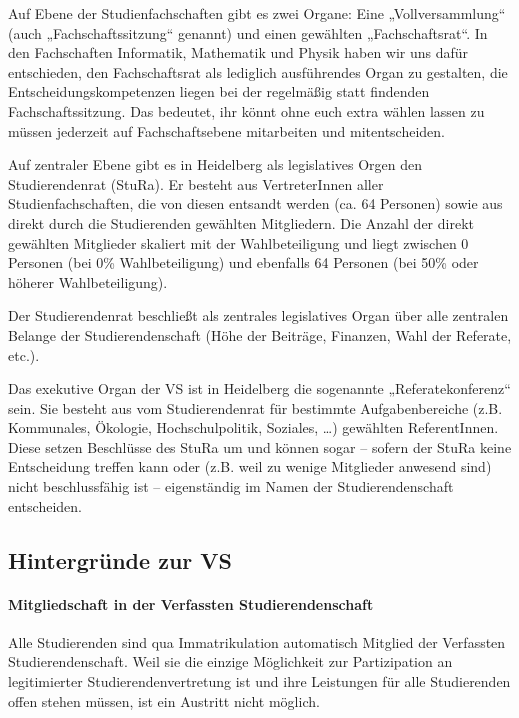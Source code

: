 Auf Ebene der Studienfachschaften gibt es zwei Organe: Eine „Vollversammlung“ 
(auch „Fachschaftssitzung“ genannt) und einen gewählten „Fachschaftsrat“. In den 
Fachschaften Informatik, Mathematik und Physik haben wir uns dafür entschieden, 
den Fachschaftsrat als lediglich ausführendes Organ zu gestalten, die 
Entscheidungskompetenzen liegen bei der regelmäßig statt findenden Fachschaftssitzung.
Das bedeutet, ihr könnt ohne euch extra wählen lassen zu müssen jederzeit
auf Fachschaftsebene mitarbeiten und mitentscheiden.

Auf zentraler Ebene gibt es in Heidelberg als legislatives Orgen den Studierendenrat (StuRa). 
Er besteht aus VertreterInnen aller Studienfachschaften, die von diesen entsandt werden
(ca. 64 Personen) sowie aus direkt durch die Studierenden gewählten Mitgliedern.
Die Anzahl der direkt gewählten Mitglieder skaliert mit der Wahlbeteiligung
und liegt zwischen 0 Personen (bei 0\% Wahlbeteiligung) und ebenfalls 64 Personen
(bei 50\% oder höherer Wahlbeteiligung).

Der Studierendenrat beschließt als zentrales legislatives Organ über alle
zentralen Belange der Studierendenschaft (Höhe der Beiträge, Finanzen,
Wahl der Referate, etc.).

Das exekutive Organ der VS ist in Heidelberg die sogenannte „Referatekonferenz“ sein.
Sie besteht aus vom Studierendenrat für bestimmte Aufgabenbereiche (z.B.
Kommunales, Ökologie, Hochschulpolitik, Soziales, \dots) gewählten
ReferentInnen. Diese setzen Beschlüsse des StuRa um und können sogar --
sofern der StuRa keine Entscheidung treffen kann oder (z.B. weil zu
wenige Mitglieder anwesend sind) nicht beschlussfähig ist --
eigenständig im Namen der Studierendenschaft entscheiden.

\subsection{Hintergründe zur VS}

\paragraph{Mitgliedschaft in der Verfassten Studierendenschaft}

Alle Studierenden sind qua Immatrikulation automatisch Mitglied der
Verfassten Studierendenschaft. Weil sie die einzige Möglichkeit zur
Partizipation an legitimierter Studierendenvertretung ist und ihre
Leistungen für alle Studierenden offen stehen müssen, ist ein Austritt
nicht möglich.

